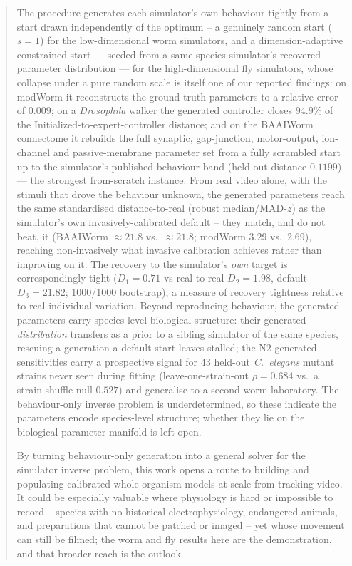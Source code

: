 \documentclass[11pt]{article}
\begin{document}
\begin{abstract}
The procedure generates each simulator's own behaviour tightly from a start drawn independently of the optimum -- a genuinely random start ($s{=}1$) for the low-dimensional worm simulators, and a dimension-adaptive constrained start --- seeded from a same-species simulator's recovered parameter distribution --- for the high-dimensional fly simulators, whose collapse under a pure random scale is itself one of our reported findings: on modWorm it reconstructs the ground-truth parameters to a relative error of $0.009$; on a \emph{Drosophila} walker the generated controller closes $94.9\%$ of the Initialized-to-expert-controller distance; and on the BAAIWorm connectome it rebuilds the full synaptic, gap-junction, motor-output, ion-channel and passive-membrane parameter set from a fully scrambled start up to the simulator's published behaviour band (held-out distance $0.1199$) --- the strongest from-scratch instance. From real video alone, with the stimuli that drove the behaviour unknown, the generated parameters reach the same standardised distance-to-real (robust median/MAD-$z$) as the simulator's own invasively-calibrated default -- they match, and do not beat, it (BAAIWorm ${\approx}21.8$ vs.\ ${\approx}21.8$; modWorm $3.29$ vs.\ $2.69$), reaching non-invasively what invasive calibration achieves rather than improving on it. The recovery to the simulator's \emph{own} target is correspondingly tight ($D_1{=}0.71$ vs real-to-real $D_2{=}1.98$, default $D_3{=}21.82$; $1000/1000$ bootstrap), a measure of recovery tightness relative to real individual variation. Beyond reproducing behaviour, the generated parameters carry species-level biological structure: their generated \emph{distribution} transfers as a prior to a sibling simulator of the same species, rescuing a generation a default start leaves stalled; the N2-generated sensitivities carry a prospective signal for $43$ held-out \emph{C.\ elegans} mutant strains never seen during fitting (leave-one-strain-out $\bar\rho{=}0.684$ vs.\ a strain-shuffle null $0.527$) and generalise to a second worm laboratory. The behaviour-only inverse problem is underdetermined, so these indicate the parameters encode species-level structure; whether they lie on the biological parameter manifold is left open.

By turning behaviour-only generation into a general solver for the simulator inverse problem, this work opens a route to building and populating calibrated whole-organism models at scale from tracking video. It could be especially valuable where physiology is hard or impossible to record -- species with no historical electrophysiology, endangered animals, and preparations that cannot be patched or imaged -- yet whose movement can still be filmed; the worm and fly results here are the demonstration, and that broader reach is the outlook.
\end{abstract}
\end{document}

